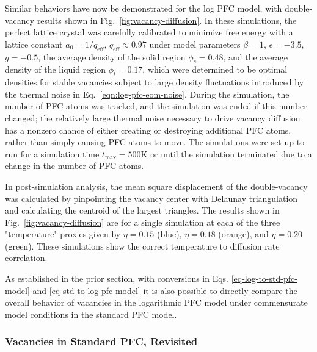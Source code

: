 Similar behaviors have now be demonstrated for the log PFC model, with double-vacancy results shown in Fig.~\ref{fig:vacancy-diffusion}.  In these simulations, the perfect lattice crystal was carefully calibrated to minimize free energy with a lattice constant $a_0 = 1/q_\text{eff}$, $q_\text{eff} \approx 0.97$ under model parameters $\beta = 1$, $\epsilon = -3.5$, $g = -0.5$, the average density of the solid region $\phi_s = 0.48$, and the average density of the liquid region $\phi_l = 0.17$, which were determined to be optimal densities for stable vacancies subject to large density fluctuations introduced by the thermal noise in Eq.~\ref{eqn:log-pfc-eom-noise}. During the simulation, the number of PFC atoms was tracked, and the simulation was ended if this number changed; the relatively large thermal noise necessary to drive vacancy diffusion has a nonzero chance of either creating or destroying additional PFC atoms, rather than simply causing PFC atoms to move.  The simulations were set up to run for a simulation time $t_\text{max} = 500 $K or until the simulation terminated due to a change in the number of PFC atoms.

In post-simulation analysis, the mean square displacement of the double-vacancy was calculated by pinpointing the vacancy center with Delaunay triangulation and calculating the centroid of the largest triangles. The results shown in Fig.~\ref{fig:vacancy-diffusion} are for a single simulation at each of the three "temperature" proxies given by $\eta = 0.15$ (blue), $\eta = 0.18$ (orange), and $\eta = 0.20$ (green).  These simulations show the correct temperature to diffusion rate correlation.

As established in the prior section, with conversions in Eqs. \ref{eq-log-to-std-pfc-model} and \ref{eq-std-to-log-pfc-model} it is also possible to directly compare the overall behavior of vacancies in the logarithmic PFC model under commensurate model conditions in the standard PFC model.

\subsubsection{Vacancies in Standard PFC, Revisited}

